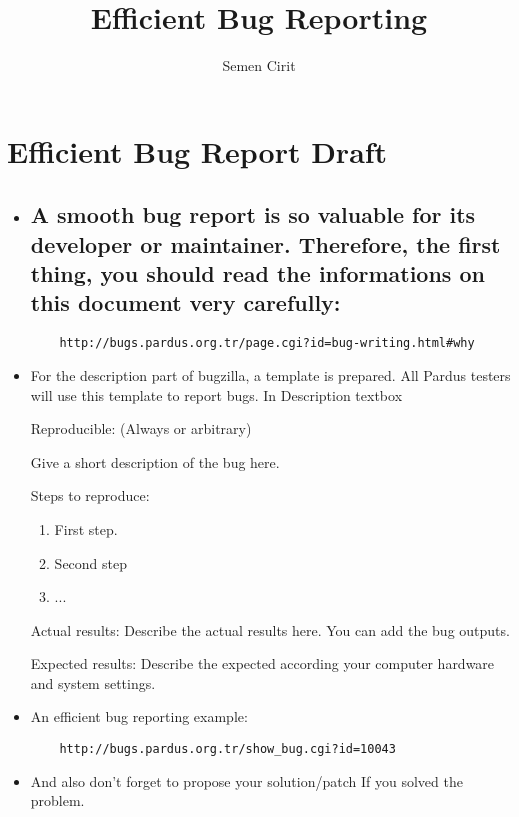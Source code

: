 \documentclass[a4paper,10pt]{article}
\title{Efficient Bug Reporting}
\author{Semen Cirit}
\begin{document}
\maketitle

\section{Efficient Bug Report Draft}

\begin{itemize}
 
  	\item \subsection*{A smooth bug report is so valuable for its developer or maintainer. Therefore, the first thing, you should read the informations on this document very carefully:}
	\begin{verbatim} 
 	http://bugs.pardus.org.tr/page.cgi?id=bug-writing.html#why
	\end{verbatim}

  	\item For the description part of bugzilla, a template is prepared. All Pardus testers will use this template to report bugs.
  	In Description textbox

   	Reproducible: (Always or arbitrary)	
   
    	Give a short description of the bug here.
   
   	Steps to reproduce:
   	\begin{enumerate}
    	\item First step.
    	\item Second step
    	\item ...
   	\end{enumerate}

	Actual results:
	Describe the actual results here. You can add the bug outputs.
	
	Expected results:
	Describe the expected according your computer hardware and system settings.
	
	\item An efficient bug reporting example:
	\begin{verbatim}
	http://bugs.pardus.org.tr/show_bug.cgi?id=10043
	\end{verbatim}
	\item And also don't forget to propose your solution/patch  If you solved the problem.


\end{itemize}
\end{document}
